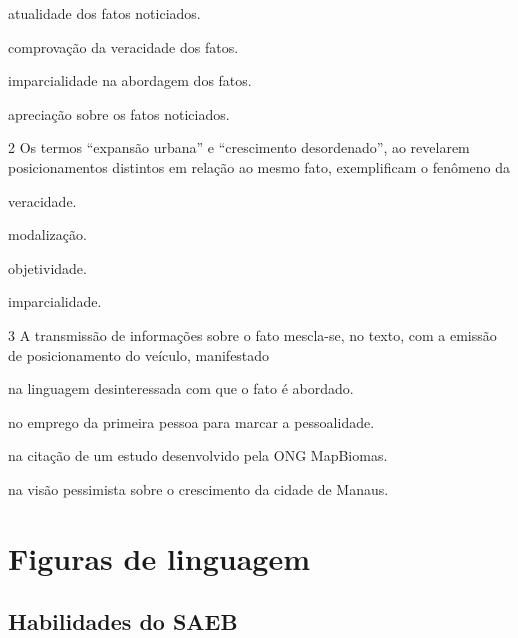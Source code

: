 \begin{escolha}
\item atualidade dos fatos noticiados.

\item comprovação da veracidade dos fatos.

\item imparcialidade na abordagem dos fatos.

\item apreciação sobre os fatos noticiados.
\end{escolha}

\num{2} Os termos ``expansão urbana'' e ``crescimento desordenado'', ao
revelarem posicionamentos distintos em relação ao mesmo fato,
exemplificam o fenômeno da

\begin{escolha}
\item veracidade.

\item modalização.

\item objetividade.

\item imparcialidade.
\end{escolha}

\num{3} A transmissão de informações sobre o fato mescla-se, no texto,
com a emissão de posicionamento do veículo, manifestado

\begin{escolha}
\item na linguagem desinteressada com que o fato é abordado.

\item no emprego da primeira pessoa para marcar a pessoalidade.

\item na citação de um estudo desenvolvido pela ONG MapBiomas.

\item na visão pessimista sobre o crescimento da cidade de Manaus.
\end{escolha}

\chapter{Figuras de linguagem}

\section*{Habilidades do SAEB}

